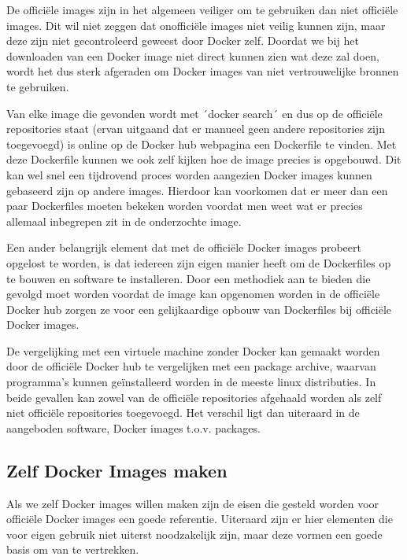 De officiële images zijn in het algemeen veiliger om te gebruiken dan niet officiële images. Dit wil niet zeggen dat onofficiële images niet veilig kunnen zijn, maar deze zijn niet gecontroleerd geweest door Docker zelf. Doordat we bij het downloaden van een Docker image niet direct kunnen zien wat deze zal doen, wordt het dus sterk afgeraden om Docker images van niet vertrouwelijke bronnen te gebruiken.

Van elke image die gevonden wordt met ´docker search´ en dus op de officiële repositories staat (ervan uitgaand dat er manueel geen andere repositories zijn toegevoegd) is online op de Docker hub webpagina een Dockerfile te vinden. Met deze Dockerfile kunnen we ook zelf kijken hoe de image precies is opgebouwd. Dit kan wel snel een tijdrovend proces worden aangezien Docker images kunnen gebaseerd zijn op andere images. Hierdoor kan voorkomen dat er meer dan een paar Dockerfiles moeten bekeken worden voordat men weet wat er precies allemaal inbegrepen zit in de onderzochte image.

Een ander belangrijk element dat met de officiële Docker images probeert opgelost te worden, is dat iedereen zijn eigen manier heeft om de Dockerfiles op te bouwen en software te installeren. Door een methodiek aan te bieden die gevolgd moet worden voordat de image kan opgenomen worden in de officiële Docker hub zorgen ze voor een gelijkaardige opbouw van Dockerfiles bij officiële Docker images.


De vergelijking met een virtuele machine zonder Docker kan gemaakt worden door de officiële Docker hub te vergelijken met een package archive, waarvan programma's kunnen geïnstalleerd worden in de meeste linux distributies. In beide gevallen kan zowel van de officiële repositories afgehaald worden als zelf niet officiële repositories toegevoegd. Het verschil ligt dan uiteraard in de aangeboden software, Docker images t.o.v. packages. 

\subsection{Zelf Docker Images maken}

Als we zelf Docker images willen maken zijn de eisen die gesteld worden voor officiële Docker images een goede referentie. Uiteraard zijn er hier elementen die voor eigen gebruik niet uiterst noodzakelijk zijn, maar deze vormen een goede basis om van te vertrekken.

